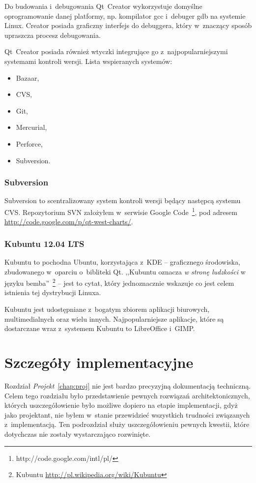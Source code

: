 Do budowania i~debugowania Qt~Creator wykorzystuje domyślne oprogramowanie danej platformy, np. kompilator gcc i~debuger gdb na systemie Linux. Creator posiada graficzny interfejs do debuggera, który w~znaczący sposób upraszcza procesz debugowania.

Qt~Creator posiada również wtyczki integrujące go z~najpopularniejszymi systemami kontroli wersji. Lista wspieranych systemów:
\begin{itemize}
\item{Bazaar,}
\item{CVS,}
\item{Git,}
\item{Mercurial,}
\item{Perforce,}
\item{Subversion.}
\end{itemize}

\subsubsection{Subversion}
Subversion to scentralizowany system kontroli wersji będący następcą systemu CVS. Repozytorium SVN założyłem w~serwisie Google Code~\footnote{http://code.google.com/intl/pl/}, pod adresem \url{http://code.google.com/p/qt-west-charts/}.

\subsubsection{Kubuntu 12.04 LTS}
Kubuntu to pochodna Ubuntu, korzystająca z~KDE -- graficznego środowiska, zbudowanego w~oparciu o~bibliteki Qt. ,,Kubuntu oznacza \textit{w stronę ludzkości} w języku bemba''~\footnote{Kubuntu \url{http://pl.wikipedia.org/wiki/Kubuntu}} -- jest to cytat, który jednoznacznie wskazuje co jest celem istnienia tej dystrybucji Linuxa.

Kubuntu jest udostępniane z~bogatym zbiorem aplikacji biurowych, multimedialnych oraz wielu innych. Najpopularniejsze aplikacje, które są dostarczane wraz z~systemem Kubuntu to LibreOffice i~GIMP. 


\section{Szczegóły implementacyjne}
Rozdział \textit{Projekt}~\ref{chap:proj} nie jest bardzo precyzyjną dokumentacją techniczną. Celem tego rozdziału było przedstawienie pewnych rozwiązań architektonicznych, których uszczegółowienie było możliwe dopiero na etapie implementacji, gdyż jako projektant, nie byłem w~stanie przewidzieć wszystkich trudności związanych z~implementacją. Ten podrozdział służy uszczegółowieniu pewnych kwestii, które dotychczas nie zostały wystarczająco rozwinięte.

